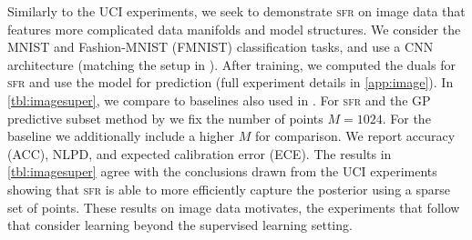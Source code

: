 \documentclass{article}
\newcommand{\our}{\textsc{sfr}\xspace}
\begin{document}
\begin{table}[t!]

\end{table}

Similarly to the UCI experiments, we seek to demonstrate \our on image data that features more complicated data manifolds and model structures. We consider the MNIST and Fashion-MNIST (FMNIST) classification tasks, and use a CNN architecture (matching the setup in \cite{immer2021improving}). After training, we computed the duals for \our and use the model for prediction (full experiment details in \cref{app:image}). In \cref{tbl:imagesuper}, we compare to baselines also used in \cite{immer2021improving}. For \our and the GP predictive subset method by \cite{immer2021improving} we fix the number of points $M=1024$. For the baseline we additionally include a higher $M$ for comparison. We report accuracy (ACC), NLPD, and expected calibration error (ECE). The results in \cref{tbl:imagesuper} agree with the conclusions drawn from the UCI experiments showing that \our is able to more efficiently capture the posterior using a sparse set of points. These results on image data motivates, the experiments that follow that consider learning beyond the supervised learning setting. 

\end{document}
